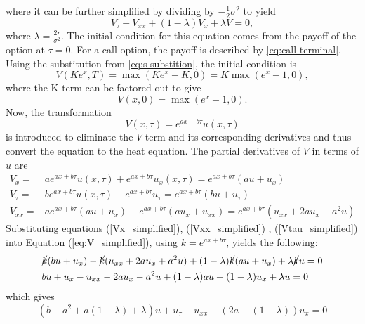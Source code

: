 where it can be further simplified by dividing 
by $-\frac{1}{2}\sigma^2$ to yield
\begin{equation}
    V_{\tau} - V_{xx} + (1-\lambda)V_x + \lambda V = 0, \label{eq:V_simplified}
\end{equation}
where $\lambda = \frac{2r}{\sigma^2}$. The initial condition for this equation comes from the payoff of the option at $\tau = 0$. For a call option, the payoff
is described by \eqref{eq:call-terminal}. Using the substitution from \eqref{eq:s-substition}, the initial condition is
\begin{equation}
    V(Ke^x, T) = \max(Ke^x - K, 0) = K \max(e^x - 1, 0),
\end{equation}
where the K term can be factored out to give
\begin{equation}
    V(x,0) = \max(e^x - 1, 0).
\end{equation}
Now, the transformation
\begin{equation}
V(x,\tau) = e^{ax+b\tau} u(x,\tau) 
\end{equation}
is introduced to eliminate the $V$ term and its corresponding derivatives and thus convert the equation to the heat equation.
The partial derivatives of $V$ in terms of $u$ are
\begin{align}
    V_x {}={}& ae^{ax+b\tau}u(x,\tau) + e^{ax+b\tau}u_x(x,\tau) = e^{ax+b\tau}(au + u_x) \label{Vx_simplified}
    \\
    V_{\tau} {}={}& be^{ax+b\tau}u(x,\tau) + e^{ax+b\tau}u_{\tau} = e^{ax+b\tau}(bu + u_{\tau}) \label{Vtau_simplified}
    \\
    V_{xx} {}={}& ae^{ax+b\tau}(au+u_x) + e^{ax+b\tau}(au_x+u_{xx}) = e^{ax+b\tau}(u_{xx} + 2au_x + a^2u) \label{Vxx_simplified}
\end{align}
Substituting equations (\ref{Vx_simplified}), (\ref{Vxx_simplified}) , (\ref{Vtau_simplified}) into Equation (\ref{eq:V_simplified}), using $k = e^{ax+b\tau}$, yields the following:
\begin{equation}
\begin{aligned}
    & \cancel{k}(bu+u_x)-\cancel{k}(u_{xx}+2au_x+a^2u)+(1-\lambda)\cancel{k}(au+u_x)+\lambda \cancel{k}u = 0 \\
    & bu + u_x - u_{xx} - 2au_x - a^2u+(1-\lambda)au +(1-\lambda)u_x+\lambda u = 0
\end{aligned}
\end{equation}
which gives
\begin{equation}
    (b-a^2+a(1-\lambda)+\lambda)u + u_\tau - u_{xx} - (2a-(1-\lambda))u_x = 0 \label{eq:v_transformed}
\end{equation}
